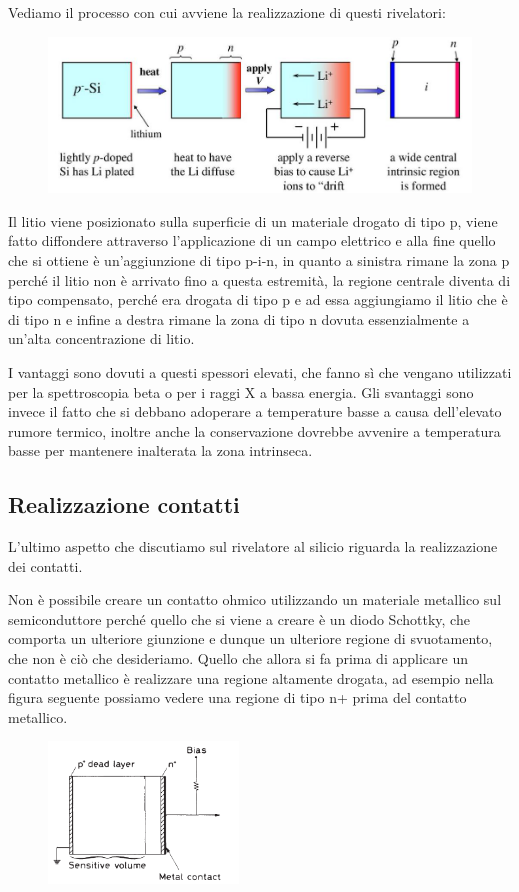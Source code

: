 Vediamo il processo con cui avviene la realizzazione di questi rivelatori:
\begin{figure}[H]
   \centering
   \includegraphics[width=\textwidth]{immagini/rivelatore_a_deriva_di_litio.png}
\end{figure}
Il litio viene posizionato sulla superficie di un materiale drogato di tipo p, viene fatto diffondere attraverso l'applicazione di un campo elettrico e alla fine quello che si ottiene è un'aggiunzione di tipo p-i-n, in quanto a sinistra rimane la zona p perché il litio non è arrivato fino a questa estremità, la regione centrale diventa di tipo compensato, perché era drogata di tipo p e ad essa aggiungiamo il litio che è di tipo n e infine a destra rimane la zona di tipo n dovuta essenzialmente a un'alta concentrazione di litio.

I vantaggi sono dovuti a questi spessori elevati, che fanno sì che vengano utilizzati per la spettroscopia beta o per i raggi X a bassa energia. Gli svantaggi sono invece il fatto che si debbano adoperare a temperature basse a causa dell'elevato rumore termico, inoltre anche la conservazione dovrebbe avvenire a temperatura basse per mantenere inalterata la zona intrinseca.

\subsection{Realizzazione contatti}
L'ultimo aspetto che discutiamo sul rivelatore al silicio riguarda la realizzazione dei contatti. 

Non è possibile creare un contatto ohmico utilizzando un materiale metallico sul semiconduttore perché quello che si viene a creare è un diodo Schottky, che comporta un ulteriore giunzione e dunque un ulteriore regione di svuotamento, che non è ciò che desideriamo. Quello che allora si fa prima di applicare un contatto metallico è realizzare una regione altamente drogata, ad esempio nella figura seguente possiamo vedere una regione di tipo n+ prima del contatto metallico.
\begin{figure}[H]
   \centering
   \includegraphics[width=0.45\textwidth]{immagini/realizzazione_contatti.png}
\end{figure}

